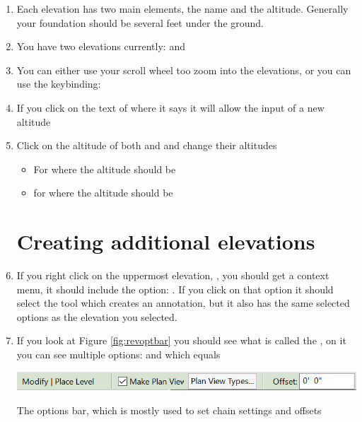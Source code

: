 \documentclass{tufte-book} %
\begin{document}
\begin{enumerate}
	\item Each elevation has two main elements, the name and the altitude. Generally your foundation should be several feet under the ground.
	\item You have two elevations currently:  and 
	\item You can either use your scroll wheel too zoom into the elevations, or you can use the keybinding: 
	\item If you click on the text of  where it says  it will allow the input of a new altitude
	\item Click on the altitude of both  and  and change their altitudes
	
	\begin{itemize}
		\item For  where the altitude should be 
		\item for  where the altitude should be 
	\end{itemize}
	
	\section{Creating additional elevations}
	\item If you right click on the uppermost elevation, , you should get a context menu, it should include the option: . If you click on that option it should select the  tool which creates an annotation, but it also has the same selected options as the elevation you selected.
	\item If you look at Figure \ref{fig:revoptbar} you should see what is called the , on it you can see multiple options:  and  which equals 
	
	\begin{marginfigure}
		\includegraphics[width=\linewidth]{revitoptionsbar.png}
		\caption{The options bar, which is mostly used to set chain settings and offsets}
		\label{fig:revoptbar}
	

\end{marginfigure}
\end{enumerate}
\end{document}
